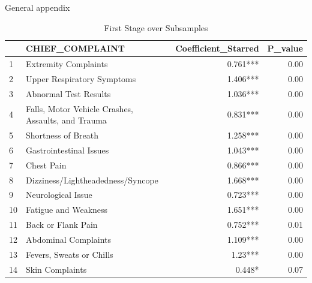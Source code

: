 \documentclass[,,nonblindrev]{informs}
\begin{document}
\begin{APPENDIX}{General appendix}
\begin{table}[ht]
\centering
\caption{First Stage over Subsamples} 
\begin{tabular}{llrr}
  \hline
 & CHIEF\_COMPLAINT & Coefficient\_Starred & P\_value \\ 
  \hline
1 & Extremity Complaints & 0.761*** & 0.00 \\ 
  2 & Upper Respiratory Symptoms & 1.406*** & 0.00 \\ 
  3 & Abnormal Test Results & 1.036*** & 0.00 \\ 
  4 & Falls, Motor Vehicle Crashes, Assaults, and Trauma & 0.831*** & 0.00 \\ 
  5 & Shortness of Breath & 1.258*** & 0.00 \\ 
  6 & Gastrointestinal Issues & 1.043*** & 0.00 \\ 
  7 & Chest Pain & 0.866*** & 0.00 \\ 
  8 & Dizziness/Lightheadedness/Syncope & 1.668*** & 0.00 \\ 
  9 & Neurological Issue & 0.723*** & 0.00 \\ 
  10 & Fatigue and Weakness & 1.651*** & 0.00 \\ 
  11 & Back or Flank Pain & 0.752*** & 0.01 \\ 
  12 & Abdominal Complaints & 1.109*** & 0.00 \\ 
  13 & Fevers, Sweats or Chills & 1.23*** & 0.00 \\ 
  14 & Skin Complaints & 0.448* & 0.07 \\ 
   \hline
\end{tabular}
\end{table}

\end{APPENDIX}

%
%
%





\end{document}
